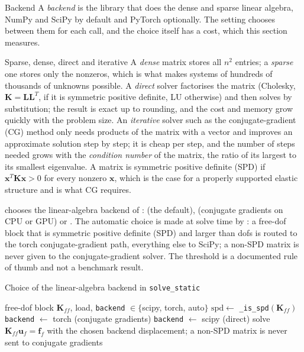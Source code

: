 \begin{sidenote}{Backend}
A \emph{backend} is the library that does the dense and sparse linear algebra, NumPy and SciPy by default and PyTorch optionally. The  setting chooses between them for each call, and the choice itself has a cost, which this section measures.
\end{sidenote}

\begin{sidenote}{Sparse, dense, direct and iterative}
A \emph{dense} matrix stores all $n^2$ entries; a \emph{sparse} one stores only the nonzeros, which is what makes systems of hundreds of thousands of unknowns possible. A \emph{direct} solver factorises the matrix (Cholesky, $\bm K=\bm L\bm L^T$, if it is symmetric positive definite, LU otherwise) and then solves by substitution; the result is exact up to rounding, and the cost and memory grow quickly with the problem size. An \emph{iterative} solver such as the conjugate-gradient (CG) method only needs products of the matrix with a vector and improves an approximate solution step by step; it is cheap per step, and the number of steps needed grows with the \emph{condition number} of the matrix, the ratio of its largest to its smallest eigenvalue. A matrix is symmetric positive definite (SPD) if $\bm x^T\bm K\bm x>0$ for every nonzero $\bm x$, which is the case for a properly supported elastic structure and is what CG requires.
\end{sidenote}

 chooses the linear-algebra backend of :  (the default),  (conjugate gradients on CPU or GPU) or . The automatic choice is made at solve time by : a free-dof block that is symmetric positive definite (SPD) and larger than \cdeDispThreshold{} dofs is routed to the torch conjugate-gradient path, everything else to SciPy; a non-SPD matrix is never given to the conjugate-gradient solver. The threshold is a documented rule of thumb and not a benchmark result.

\begin{algbox}{Choice of the linear-algebra backend in \texttt{solve\_static}}
\begin{pseudo}
\Require free-dof block $\bm K_{ff}$, load, \texttt{backend} $\in\{$scipy, torch, auto$\}$
  \State $\mathrm{spd}\gets$ \texttt{\_is\_spd}$(\bm K_{ff})$ 
    \State \texttt{backend} $\gets$ torch (conjugate gradients)
  \Else
    \State \texttt{backend} $\gets$ scipy (direct)
  \EndIf
\EndIf
\State solve $\bm K_{ff}\bm u_f=\bm f_f$ with the chosen backend
\Ensure displacement; a non-SPD matrix is never sent to conjugate gradients
\end{pseudo}
\end{algbox}

